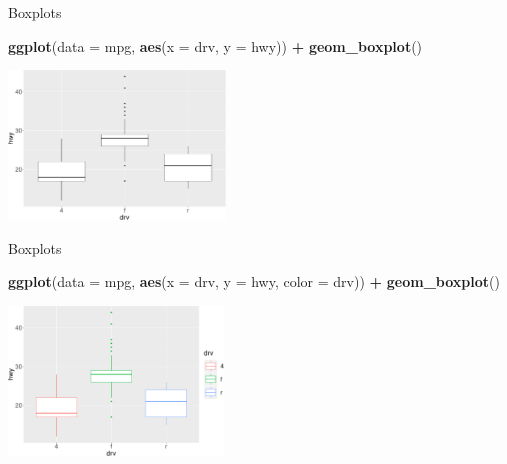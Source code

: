 \documentclass[ignorenonframetext,]{beamer}
\newenvironment{Shaded}{\begin{snugshade}}{\end{snugshade}}
\newcommand{\DataTypeTok}[1]{\textcolor[rgb]{0.13,0.29,0.53}{#1}}
\newcommand{\KeywordTok}[1]{\textcolor[rgb]{0.13,0.29,0.53}{\textbf{#1}}}
\newcommand{\NormalTok}[1]{#1}
\newcommand{\OperatorTok}[1]{\textcolor[rgb]{0.81,0.36,0.00}{\textbf{#1}}}
\newcommand{\StringTok}[1]{\textcolor[rgb]{0.31,0.60,0.02}{#1}}
\begin{document}
\begin{frame}[fragile]{Boxplots}
\protect\hypertarget{boxplots-1}{}

\begin{Shaded}
\begin{Highlighting}[]
\KeywordTok{ggplot}\NormalTok{(}\DataTypeTok{data =}\NormalTok{ mpg, }\KeywordTok{aes}\NormalTok{(}\DataTypeTok{x =}\NormalTok{ drv, }\DataTypeTok{y =}\NormalTok{ hwy)) }\OperatorTok{+}\StringTok{ }
\StringTok{  }\KeywordTok{geom_boxplot}\NormalTok{()}
\end{Highlighting}
\end{Shaded}

\begin{center}\includegraphics[height=150px]{data-visualization_files/figure-beamer/unnamed-chunk-137-1} \end{center}

\end{frame}

\begin{frame}[fragile]{Boxplots}
\protect\hypertarget{boxplots-2}{}

\begin{Shaded}
\begin{Highlighting}[]
\KeywordTok{ggplot}\NormalTok{(}\DataTypeTok{data =}\NormalTok{ mpg, }
       \KeywordTok{aes}\NormalTok{(}\DataTypeTok{x =}\NormalTok{ drv, }\DataTypeTok{y =}\NormalTok{ hwy, }\DataTypeTok{color =}\NormalTok{ drv)) }\OperatorTok{+}\StringTok{ }
\StringTok{  }\KeywordTok{geom_boxplot}\NormalTok{()}
\end{Highlighting}
\end{Shaded}

\begin{center}\includegraphics[height=150px]{data-visualization_files/figure-beamer/unnamed-chunk-138-1} \end{center}

\end{frame}
\end{document}
